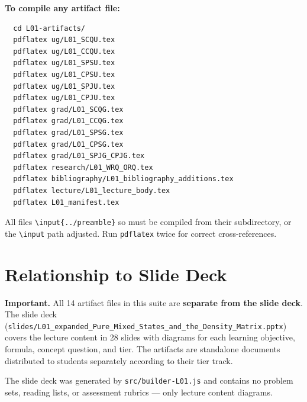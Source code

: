 \documentclass[11pt,a4paper]{article}
\begin{document}
\begin{tcolorbox}[goldbox]
\textbf{To compile any artifact file:}
\begin{verbatim}
  cd L01-artifacts/
  pdflatex ug/L01_SCQU.tex
  pdflatex ug/L01_CCQU.tex
  pdflatex ug/L01_SPSU.tex
  pdflatex ug/L01_CPSU.tex
  pdflatex ug/L01_SPJU.tex
  pdflatex ug/L01_CPJU.tex
  pdflatex grad/L01_SCQG.tex
  pdflatex grad/L01_CCQG.tex
  pdflatex grad/L01_SPSG.tex
  pdflatex grad/L01_CPSG.tex
  pdflatex grad/L01_SPJG_CPJG.tex
  pdflatex research/L01_WRQ_ORQ.tex
  pdflatex bibliography/L01_bibliography_additions.tex
  pdflatex lecture/L01_lecture_body.tex
  pdflatex L01_manifest.tex
\end{verbatim}
All files \texttt{\textbackslash input\{../preamble\}} so must be compiled from
their subdirectory, or the \texttt{\textbackslash input} path adjusted.
Run \texttt{pdflatex} twice for correct cross-references.
\end{tcolorbox}

\bigskip
\section*{Relationship to Slide Deck}

\begin{tcolorbox}[notebox]
\textbf{Important.}
All 14 artifact files in this suite are \textbf{separate from the slide deck}.
The slide deck (\texttt{slides/L01\_expanded\_Pure\_Mixed\_States\_and\_the\_Density\_Matrix.pptx})
covers the lecture content in 28 slides with diagrams for each learning objective,
formula, concept question, and tier. The artifacts are standalone documents
distributed to students separately according to their tier track.

The slide deck was generated by \texttt{src/builder-L01.js} and contains no
problem sets, reading lists, or assessment rubrics --- only lecture content diagrams.
\end{tcolorbox}
\end{document}
